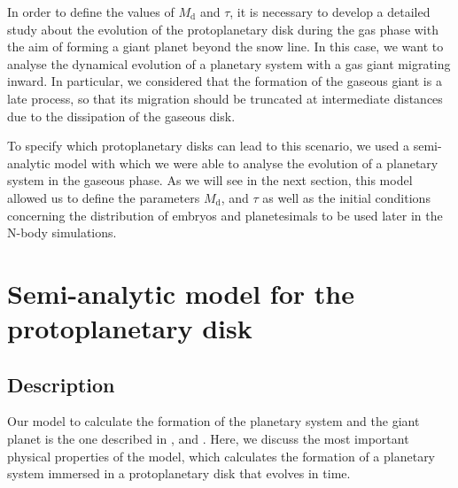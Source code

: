 \documentclass{aa}
\begin{document}
In order to define the values of $M_{\text{d}}$ and $\tau$, it is
necessary to develop a detailed study about the evolution of the protoplanetary disk during the gas phase with the aim of forming a giant
planet beyond the snow line. In this case, we want to analyse the dynamical evolution of a planetary system with a gas giant migrating
inward. In particular, we considered that the formation of the gaseous giant is a late process, so that its migration should be
truncated at intermediate distances due to the dissipation of the gaseous disk.

To specify which protoplanetary disks can lead to this scenario, we used a semi-analytic model with which we were able to analyse the
evolution of a planetary system in the gaseous phase. As we will see in the next section, this model allowed us to define the
parameters $M_{\text{d}}$, and $\tau$ as well as the initial conditions concerning the distribution of embryos and planetesimals
to be used later in the N-body simulations.

\section{Semi-analytic model for the protoplanetary disk}
\label{section_semianalitical_model}

\subsection{Description}
\label{section_semianalitical_model_description}

Our model to calculate the formation of the planetary system and the giant planet is the one described in \citet{Guilera2010}, \citet{Guilera2011} and \citet{Guilera2014}. Here, we discuss the most important physical properties
of the model, which calculates the formation of a planetary system immersed in a protoplanetary disk that evolves in time.
\end{document}
